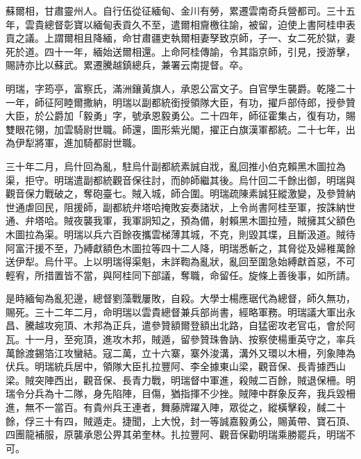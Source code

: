 \begin{pinyinscope}
蘇爾相，甘肅靈州人。自行伍從征緬甸、金川有勞，累遷雲南奇兵營都司。三十五年，雲貴總督彰寶以緬甸表貢久不至，遣爾相齎檄往諭，被留，迫使上書阿桂申表貢之議。上謂爾相且降緬，命甘肅疆吏執爾相妻孥致京師，子一、女二死於獄，妻死於道。四十一年，緬始送爾相還。上命阿桂傳諭，令其詣京師，引見，授游擊，賜詩亦比以蘇武。累遷騰越鎮總兵，兼署云南提督。卒。

明瑞，字筠亭，富察氏，滿洲鑲黃旗人，承恩公富文子。自官學生襲爵。乾隆二十一年，師征阿睦爾撒納，明瑞以副都統銜授領隊大臣，有功，擢戶部侍郎，授參贊大臣，於公爵加「毅勇」字，號承恩毅勇公。二十四年，師征霍集占，復有功，賜雙眼花翎，加雲騎尉世職。師還，圖形紫光閣，擢正白旗漢軍都統。二十七年，出為伊犁將軍，進加騎都尉世職。

三十年二月，烏什回為亂，駐烏什副都統素誠自戕，亂回推小伯克賴黑木圖拉為渠，拒守。明瑞遣副都統觀音保往討，而帥師繼其後。烏什回二千餘出御，明瑞與觀音保力戰破之，奪砲臺七。賊入城，師合圍。明瑞疏陳素誠狂縱激變，及參贊納世通虐回民，阻援師，副都統弁塔哈掩敗妄奏諸狀，上令尚書阿桂至軍，按誅納世通、弁塔哈。賊夜襲我軍，我軍詗知之，預為備，射賴黑木圖拉殪，賊擁其父額色木圖拉為渠。明瑞以兵六百餘夜攜雲梯薄其城，不克，則毀其堞，且斷汲道。賊待阿富汗援不至，乃縛獻額色木圖拉等四十二人降，明瑞悉斬之，其脅從及婦稚萬餘送伊犁。烏什平。上以明瑞得渠魁，未詳鞫為亂狀，亂回至圍急始縛獻首惡，不可輕宥，所措置皆不當，與阿桂同下部議，奪職，命留任。旋條上善後事，如所請。

是時緬甸為亂犯邊，總督劉藻戰屢敗，自殺。大學士楊應琚代為總督，師久無功，賜死。三十二年二月，命明瑞以雲貴總督兼兵部尚書，經略軍務。明瑞議大軍出永昌、騰越攻宛頂、木邦為正兵，遣參贊額爾登額出北路，自猛密攻老官屯，會於阿瓦。十一月，至宛頂，進攻木邦，賊遁，留參贊珠魯訥、按察使楊重英守之，率兵萬餘渡錫箔江攻蠻結。寇二萬，立十六寨，寨外浚溝，溝外又環以木柵，列象陣為伏兵。明瑞統兵居中，領隊大臣扎拉豐阿、李全據東山梁，觀音保、長青據西山梁。賊突陣西出，觀音保、長青力戰，明瑞督中軍進，殺賊二百餘，賊退保柵。明瑞令分兵為十二隊，身先陷陣，目傷，猶指揮不少挫。賊陣中群象反奔，我兵毀柵進，無不一當百。有貴州兵王連者，舞藤牌躍入陣，眾從之，縱橫擊殺，馘二十餘，俘三十有四，賊遁走。捷聞，上大悅，封一等誠嘉毅勇公，賜黃帶、寶石頂、四團龍補服，原襲承恩公畀其弟奎林。扎拉豐阿、觀音保勸明瑞乘勝罷兵，明瑞不可。


\end{pinyinscope}
